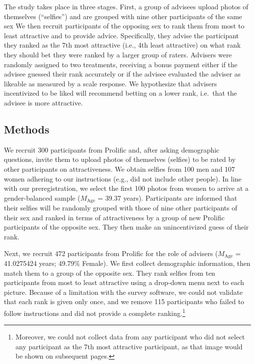 \documentclass[
  man,
  floatsintext,
  longtable,
  nolmodern,
  notxfonts,
  notimes,
  colorlinks=true,linkcolor=blue,citecolor=blue,urlcolor=blue]{apa7}
\begin{document}
The study takes place in three stages. First, a group of advisees upload
photos of themselves (``selfies'') and are grouped with nine other
participants of the same sex We then recruit participants of the
opposing sex to rank them from most to least attractive and to provide
advice. Specifically, they advise the participant they ranked as the 7th
most attractive (i.e., 4th least attractive) on what rank they should
bet they were ranked by a larger group of raters. Advisers were randomly
assigned to two treatments, receiving a bonus payment either if the
advisee guessed their rank accurately or if the advisee evaluated the
adviser as likeable as measured by a scale response. We hypothesize that
advisers incentivized to be liked will recommend betting on a lower
rank, i.e.~that the advisee is more attractive.

\subsection{Methods}\label{methods-1}

We recruit 300 participants from Prolific and, after asking demographic
questions, invite them to upload photos of themselves (selfies) to be
rated by other participants on attractiveness. We obtain selfies from
100 men and 107 women adhering to our instructions (e.g., did not
include other people). In line with our preregistration, we select the
first 100 photos from women to arrive at a gender-balanced sample
(\(M_{\text{Age}}\) = 39.37 years). Participants are informed that their
selfies will be randomly grouped with those of nine other participants
of their sex and ranked in terms of attractiveness by a group of new
Prolific participants of the opposite sex. They then make an
unincentivized guess of their rank.

Next, we recruit 472 participants from Prolific for the role of advisers
(\(M_{\text{Age}}\) = 41.0275424 years; 49.79\% Female). We first
collect demographic information, then match them to a group of the
opposite sex. They rank selfies from ten participants from most to least
attractive using a drop-down menu next to each picture. Because of a
limitation with the survey software, we could not validate that each
rank is given only once, and we remove 115 participants who failed to
follow instructions and did not provide a complete ranking.\footnote{Moreover,
  we could not collect data from any participant who did not select any
  participant as the 7th most attractive participant, as that image
  would be shown on subsequent pages.}
\end{document}
